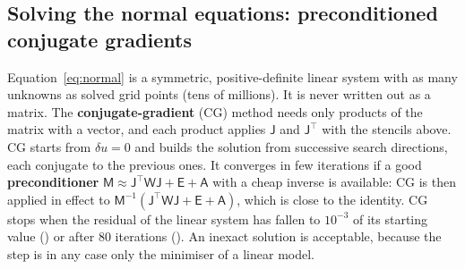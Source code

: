 \subsection{Solving the normal equations: preconditioned conjugate gradients}
Equation~\eqref{eq:normal} is a symmetric, positive-definite linear system with as many unknowns as solved grid points (tens
of millions). It is never written out as a matrix. The \textbf{conjugate-gradient} (CG) method needs only products of the
matrix with a vector, and each product applies $\mathsf J$ and $\mathsf J^{\!\top}$ with the stencils above. CG starts from
$\delta u=0$ and builds the solution from successive search directions, each conjugate to the previous ones. It converges in
few iterations if a good \textbf{preconditioner} $\mathsf M\approx\mathsf J^{\!\top}\mathsf W\mathsf J+\mathsf E+\mathsf A$
with a cheap inverse is available: CG is then applied in effect to $\mathsf M^{-1}(\mathsf J^{\!\top}\mathsf W\mathsf
J+\mathsf E+\mathsf A)$, which is close to the identity. CG stops when the residual of the linear system has fallen to
$10^{-3}$ of its starting value () or after 80 iterations (). An inexact solution is
acceptable, because the step is in any case only the minimiser of a linear model.

